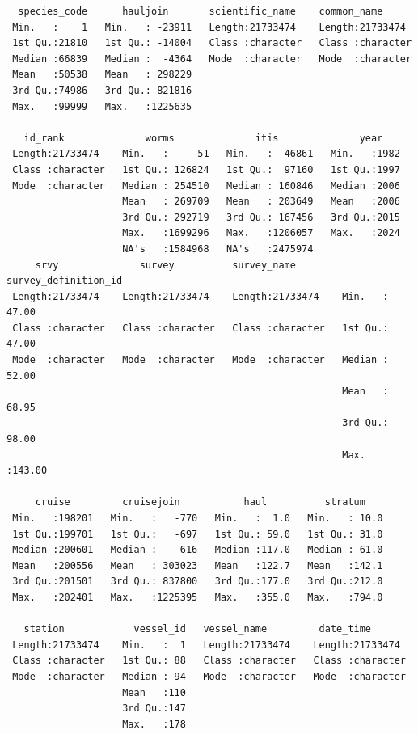 \documentclass[
  letterpaper,
  oneside,
  open=any]{scrbook}
\begin{document}
\begin{verbatim}
  species_code      hauljoin       scientific_name    common_name       
 Min.   :    1   Min.   : -23911   Length:21733474    Length:21733474   
 1st Qu.:21810   1st Qu.: -14004   Class :character   Class :character  
 Median :66839   Median :  -4364   Mode  :character   Mode  :character  
 Mean   :50538   Mean   : 298229                                        
 3rd Qu.:74986   3rd Qu.: 821816                                        
 Max.   :99999   Max.   :1225635                                        
                                                                        
   id_rank              worms              itis              year     
 Length:21733474    Min.   :     51   Min.   :  46861   Min.   :1982  
 Class :character   1st Qu.: 126824   1st Qu.:  97160   1st Qu.:1997  
 Mode  :character   Median : 254510   Median : 160846   Median :2006  
                    Mean   : 269709   Mean   : 203649   Mean   :2006  
                    3rd Qu.: 292719   3rd Qu.: 167456   3rd Qu.:2015  
                    Max.   :1699296   Max.   :1206057   Max.   :2024  
                    NA's   :1584968   NA's   :2475974                 
     srvy              survey          survey_name        survey_definition_id
 Length:21733474    Length:21733474    Length:21733474    Min.   : 47.00      
 Class :character   Class :character   Class :character   1st Qu.: 47.00      
 Mode  :character   Mode  :character   Mode  :character   Median : 52.00      
                                                          Mean   : 68.95      
                                                          3rd Qu.: 98.00      
                                                          Max.   :143.00      
                                                                              
     cruise         cruisejoin           haul          stratum     
 Min.   :198201   Min.   :   -770   Min.   :  1.0   Min.   : 10.0  
 1st Qu.:199701   1st Qu.:   -697   1st Qu.: 59.0   1st Qu.: 31.0  
 Median :200601   Median :   -616   Median :117.0   Median : 61.0  
 Mean   :200556   Mean   : 303023   Mean   :122.7   Mean   :142.1  
 3rd Qu.:201501   3rd Qu.: 837800   3rd Qu.:177.0   3rd Qu.:212.0  
 Max.   :202401   Max.   :1225395   Max.   :355.0   Max.   :794.0  
                                                                   
   station            vessel_id   vessel_name         date_time        
 Length:21733474    Min.   :  1   Length:21733474    Length:21733474   
 Class :character   1st Qu.: 88   Class :character   Class :character  
 Mode  :character   Median : 94   Mode  :character   Mode  :character  
                    Mean   :110                                        
                    3rd Qu.:147                                        
                    Max.   :178                                        
                                                                       

\end{verbatim}
\end{document}
